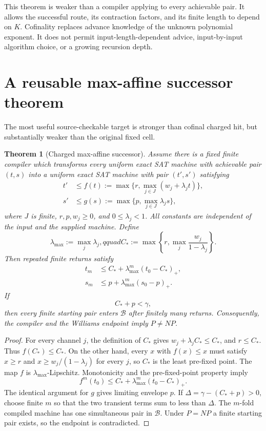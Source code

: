 \documentclass[11pt]{article}
\newtheorem{theorem}{Theorem}[section]
\newcommand{\B}{\mathcal B}
\begin{document}
This theorem is weaker than a compiler applying to every achievable pair.  It
allows the successful route, its contraction factors, and its finite length
to depend on $K$.  Cofinality replaces advance knowledge of the unknown
polynomial exponent.  It does not permit input-length-dependent advice,
input-by-input algorithm choice, or a growing recursion depth.

\section{A reusable max-affine successor theorem}

The most useful source-checkable target is stronger than cofinal charged hit,
but substantially weaker than the original fixed cell.

\begin{theorem}[Charged max-affine successor]
Assume there is a fixed finite compiler which transforms every uniform exact
SAT machine with achievable pair $(t,s)$ into a uniform exact SAT machine with
pair $(t',s')$ satisfying
\begin{align}
 t'&\leq f(t):=\max\{r,\max_{j\in J}(w_j+\lambda_jt)\},\label{eq:maxafftime}\\
 s'&\leq g(s):=\max\{p,\max_{j\in J}\lambda_js\},\label{eq:maxaffspace}
\end{align}
where $J$ is finite, $r,p,w_j\geq0$, and $0\leq\lambda_j<1$.  All constants
are independent of the input and the supplied machine.  Define
\[
 \lambda_{\max}:=\max_j\lambda_j,qquad
 C_*:=\max\left\{r,\max_j\frac{w_j}{1-\lambda_j}\right\}.
\]
Then repeated finite returns satisfy
\begin{align*}
 t_m&\leq C_*+\lambda_{\max}^m(t_0-C_*)_+,\\
 s_m&\leq p+\lambda_{\max}^m(s_0-p)_+.
\end{align*}
If
\begin{equation}
 \boxed{C_*+p<\gamma,}\label{eq:maincriterion}
\end{equation}
then every finite starting pair enters $\B$ after finitely many returns.
Consequently, the compiler and the Williams endpoint imply $P\ne NP$.
\end{theorem}

\begin{proof}
For every channel $j$, the definition of $C_*$ gives
$w_j+\lambda_jC_*\leq C_*$, and $r\leq C_*$.  Thus $f(C_*)\leq C_*$.  On the
other hand, every $x$ with $f(x)\leq x$ must satisfy $x\geq r$ and
$x\geq w_j/(1-\lambda_j)$ for every $j$, so $C_*$ is the least pre-fixed
point.  The map $f$ is $\lambda_{\max}$-Lipschitz.  Monotonicity and the
pre-fixed-point property imply
\[
 f^m(t_0)\leq C_*+\lambda_{\max}^m(t_0-C_*)_+.
\]
The identical argument for $g$ gives limiting envelope $p$.  If
$\Delta=\gamma-(C_*+p)>0$, choose finite $m$ so that the two transient terms
sum to less than $\Delta$.  The $m$-fold compiled machine has one simultaneous
pair in $\B$.  Under $P=NP$ a finite starting pair exists, so the endpoint is
contradicted.
\end{proof}
\end{document}
